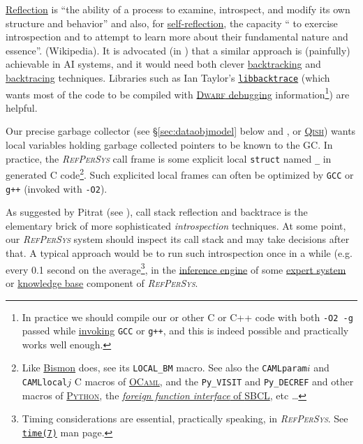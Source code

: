 \documentclass[11pt,a4paper,svgnames]{article}
\newcommand{\RefPerSys}{{\textit{\textsc{RefPerSys}}}}
\begin{document}
 
\medskip

\href{https://en.wikipedia.org/wiki/Reflection_(computer_programming)}{Reflection}
is ``the ability of a process to examine, introspect, and modify its
own structure and behavior'' and also, for
\href{https://en.wikipedia.org/wiki/Self-reflection}{self-reflection},
the capacity `` to exercise introspection and to attempt to learn more
about their fundamental nature and essence''. (Wikipedia). It is
advocated (in \cite{Pitrat:2009:ArtifBeings}) that a similar approach
is (painfully) achievable in AI systems, and it would need both clever
\href{https://en.wikipedia.org/wiki/Backtracking}{backtracking} and
\href{https://en.wikipedia.org/wiki/Stack_trace}{backtracing}
techniques.
 Libraries such as Ian Taylor's
 \href{https://github.com/ianlancetaylor/libbacktrace}{\texttt{libbacktrace}}
 (which wants most of the code to be compiled with
 \href{https://en.wikipedia.org/wiki/DWARF}{\textsc{Dwarf} debugging}
 information\footnote{In practice we should compile our or other C or
 C++ code with both \texttt{-O2 -g} passed while
 \href{https://gcc.gnu.org/onlinedocs/gcc/Invoking-GCC.html}{invoking}
 \texttt{GCC} or \texttt{g++}, and this is indeed possible and
 practically works well enough.}) are helpful.

 Our precise garbage collector (see \S \ref{sec:dataobjmodel} below
 and \cite{rafkind:2009:precise-gc}, or
 \href{http://starynkevitch.net/Basile/qishintro.html}{\textsc{Qish}})
 wants local variables holding garbage collected pointers to be known
 to the GC. In practice, the {\RefPerSys} call frame is some explicit
 local \texttt{struct} named \texttt{\_} in generated C
 code\footnote{Like \href{http://github.com/bstarynk/bismon/}{Bismon}
 does, see its \texttt{LOCAL\_BM} macro. See also the
 \texttt{CAMLparam$i$} and \texttt{CAMLlocal$j$} C macros of
 \href{https://caml.inria.fr/pub/docs/manual-ocaml/intfc.htm}{\textsc{OCaml}},
 and the \texttt{Py\_VISIT} and \texttt{Py\_DECREF} and other macros
 of
 \href{https://docs.python.org/3/extending/}{\textsc{Python}}, the \href{http://www.sbcl.org/manual/index.html\#Foreign-Function-Interface}{\textit{foreign function interface} of \textsc{SBCL}}, etc \ldots}. Such
 explicited local frames can often be optimized by \texttt{GCC} or
 \texttt{g++} (invoked with \texttt{-O2}).

 As suggested by Pitrat (see \cite{Pitrat:1996:FGCS, Pitrat:2009:AST,
   Pitrat:2009:ArtifBeings}), call stack reflection and backtrace is
 the elementary brick of more sophisticated \emph{introspection}
 techniques. At some point, our {\RefPerSys} system should inspect its
 call stack and may take decisions after that. A typical approach
 would be to run such introspection once in a while (e.g. every 0.1
 second on the average\footnote{Timing considerations are essential,
 practically speaking, in \RefPerSys. See
 \href{http://man7.org/linux/man-pages/man7/time.7.html}{\texttt{time(7)}}
 man page.}, in the
 \href{https://en.wikipedia.org/wiki/Inference_engine}{inference
   engine} of some
 \href{https://en.wikipedia.org/wiki/Expert\_system}{expert system} or
 \href{https://en.wikipedia.org/wiki/Knowledge_base}{knowledge base}
 component of {\RefPerSys}.
\end{document}
